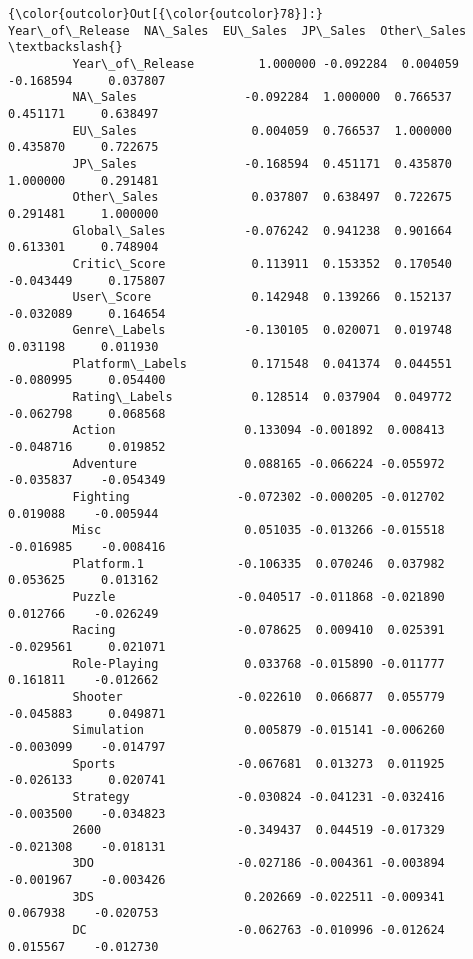 \documentclass[11pt]{article}
\begin{document}
\begin{Verbatim}[commandchars=\\\{\}]
{\color{outcolor}Out[{\color{outcolor}78}]:}                  Year\_of\_Release  NA\_Sales  EU\_Sales  JP\_Sales  Other\_Sales  \textbackslash{}
         Year\_of\_Release         1.000000 -0.092284  0.004059 -0.168594     0.037807   
         NA\_Sales               -0.092284  1.000000  0.766537  0.451171     0.638497   
         EU\_Sales                0.004059  0.766537  1.000000  0.435870     0.722675   
         JP\_Sales               -0.168594  0.451171  0.435870  1.000000     0.291481   
         Other\_Sales             0.037807  0.638497  0.722675  0.291481     1.000000   
         Global\_Sales           -0.076242  0.941238  0.901664  0.613301     0.748904   
         Critic\_Score            0.113911  0.153352  0.170540 -0.043449     0.175807   
         User\_Score              0.142948  0.139266  0.152137 -0.032089     0.164654   
         Genre\_Labels           -0.130105  0.020071  0.019748  0.031198     0.011930   
         Platform\_Labels         0.171548  0.041374  0.044551 -0.080995     0.054400   
         Rating\_Labels           0.128514  0.037904  0.049772 -0.062798     0.068568   
         Action                  0.133094 -0.001892  0.008413 -0.048716     0.019852   
         Adventure               0.088165 -0.066224 -0.055972 -0.035837    -0.054349   
         Fighting               -0.072302 -0.000205 -0.012702  0.019088    -0.005944   
         Misc                    0.051035 -0.013266 -0.015518 -0.016985    -0.008416   
         Platform.1             -0.106335  0.070246  0.037982  0.053625     0.013162   
         Puzzle                 -0.040517 -0.011868 -0.021890  0.012766    -0.026249   
         Racing                 -0.078625  0.009410  0.025391 -0.029561     0.021071   
         Role-Playing            0.033768 -0.015890 -0.011777  0.161811    -0.012662   
         Shooter                -0.022610  0.066877  0.055779 -0.045883     0.049871   
         Simulation              0.005879 -0.015141 -0.006260 -0.003099    -0.014797   
         Sports                 -0.067681  0.013273  0.011925 -0.026133     0.020741   
         Strategy               -0.030824 -0.041231 -0.032416 -0.003500    -0.034823   
         2600                   -0.349437  0.044519 -0.017329 -0.021308    -0.018131   
         3DO                    -0.027186 -0.004361 -0.003894 -0.001967    -0.003426   
         3DS                     0.202669 -0.022511 -0.009341  0.067938    -0.020753   
         DC                     -0.062763 -0.010996 -0.012624  0.015567    -0.012730   

\end{Verbatim}
\end{document}
